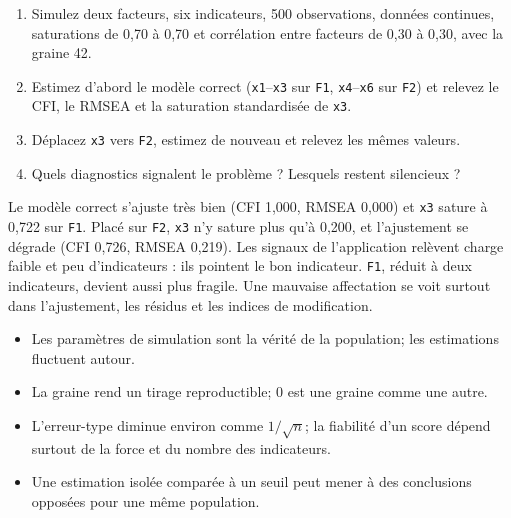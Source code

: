 \documentclass[
  french,
  11pt,
  a4paper,
  DIV=11,
  numbers=noendperiod]{scrreprt}
\providecommand{\tightlist}{%
  \setlength{\itemsep}{0pt}\setlength{\parskip}{0pt}}
\begin{document}
\begin{enumerate}
\def\labelenumi{\arabic{enumi}.}
\tightlist
\item
  Simulez deux facteurs, six indicateurs, 500 observations, données
  continues, saturations de 0,70 à 0,70 et corrélation entre facteurs de
  0,30 à 0,30, avec la graine 42.
\item
  Estimez d'abord le modèle correct (\texttt{x1}--\texttt{x3} sur
  \texttt{F1}, \texttt{x4}--\texttt{x6} sur \texttt{F2}) et relevez le
  CFI, le RMSEA et la saturation standardisée de \texttt{x3}.
\item
  Déplacez \texttt{x3} vers \texttt{F2}, estimez de nouveau et relevez
  les mêmes valeurs.
\item
  Quels diagnostics signalent le problème ? Lesquels restent silencieux
  ?
\end{enumerate}

\begin{tcolorbox}[enhanced jigsaw, arc=.35mm, bottomrule=.15mm, bottomtitle=1mm, breakable, colback=white, colbacktitle=quarto-callout-tip-color!10!white, colframe=quarto-callout-tip-color-frame, coltitle=black, left=2mm, leftrule=.75mm, opacityback=0, opacitybacktitle=0.6, rightrule=.15mm, title={Réponse}, titlerule=0mm, toprule=.15mm, toptitle=1mm]

Le modèle correct s'ajuste très bien (CFI 1,000, RMSEA 0,000) et
\texttt{x3} sature à 0,722 sur \texttt{F1}. Placé sur \texttt{F2},
\texttt{x3} n'y sature plus qu'à 0,200, et l'ajustement se dégrade (CFI
0,726, RMSEA 0,219). Les signaux de l'application relèvent charge faible
et peu d'indicateurs : ils pointent le bon indicateur. \texttt{F1},
réduit à deux indicateurs, devient aussi plus fragile. Une mauvaise
affectation se voit surtout dans l'ajustement, les résidus et les
indices de modification.

\end{tcolorbox}

\begin{tcolorbox}[enhanced jigsaw, arc=.35mm, bottomrule=.15mm, bottomtitle=1mm, breakable, colback=white, colbacktitle=quarto-callout-important-color!10!white, colframe=quarto-callout-important-color-frame, coltitle=black, left=2mm, leftrule=.75mm, opacityback=0, opacitybacktitle=0.6, rightrule=.15mm, title={À retenir}, titlerule=0mm, toprule=.15mm, toptitle=1mm]

\begin{itemize}
\tightlist
\item
  Les paramètres de simulation sont la vérité de la population; les
  estimations fluctuent autour.
\item
  La graine rend un tirage reproductible; 0 est une graine comme une
  autre.
\item
  L'erreur-type diminue environ comme \(1/\sqrt{n}\); la fiabilité d'un
  score dépend surtout de la force et du nombre des indicateurs.
\item
  Une estimation isolée comparée à un seuil peut mener à des conclusions
  opposées pour une même population.
\end{itemize}

\end{tcolorbox}
\end{document}
